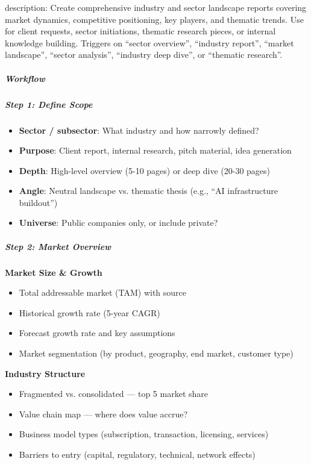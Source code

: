 \documentclass[11pt]{article}
\begin{document}
description: Create comprehensive industry and sector landscape reports covering market dynamics, competitive positioning, key players, and thematic trends. Use for client requests, sector initiations, thematic research pieces, or internal knowledge building. Triggers on ``sector overview'', ``industry report'', ``market landscape'', ``sector analysis'', ``industry deep dive'', or ``thematic research''.


\subparagraph{Workflow}\mbox{}\par

\subparagraph{Step 1: Define Scope}\mbox{}\par

\begin{itemize}[leftmargin=*,itemsep=2pt,topsep=2pt]
\item {} \textbf{Sector / subsector}: What industry and how narrowly defined?
\item {} \textbf{Purpose}: Client report, internal research, pitch material, idea generation
\item {} \textbf{Depth}: High-level overview (5-10 pages) or deep dive (20-30 pages)
\item {} \textbf{Angle}: Neutral landscape vs. thematic thesis (e.g., ``AI infrastructure buildout'')
\item {} \textbf{Universe}: Public companies only, or include private?
\end{itemize}

\subparagraph{Step 2: Market Overview}\mbox{}\par

\textbf{Market Size \& Growth}

\begin{itemize}[leftmargin=*,itemsep=2pt,topsep=2pt]
\item {} Total addressable market (TAM) with source
\item {} Historical growth rate (5-year CAGR)
\item {} Forecast growth rate and key assumptions
\item {} Market segmentation (by product, geography, end market, customer type)
\end{itemize}

\textbf{Industry Structure}

\begin{itemize}[leftmargin=*,itemsep=2pt,topsep=2pt]
\item {} Fragmented vs. consolidated — top 5 market share
\item {} Value chain map — where does value accrue?
\item {} Business model types (subscription, transaction, licensing, services)
\item {} Barriers to entry (capital, regulatory, technical, network effects)
\end{itemize}
\end{document}
